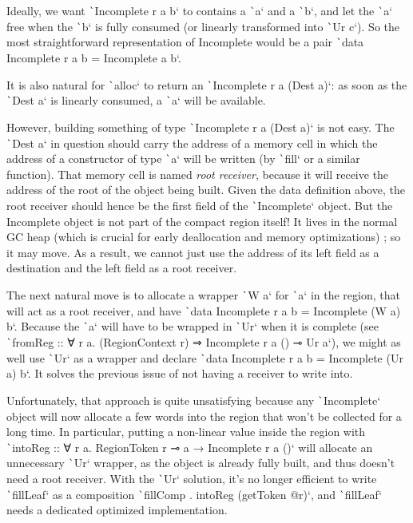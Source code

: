 \documentclass[english]{jflart}
\begin{document}
Ideally, we want \texttt`Incomplete r a b` to contains a \texttt`a` and a \texttt`b`, and let the \texttt`a` free when the \texttt`b` is fully consumed (or linearly transformed into \texttt`Ur c`). So the most straightforward representation of Incomplete would be a pair \texttt`data Incomplete r a b = Incomplete a b`.

It is also natural for \texttt`alloc` to return an \texttt`Incomplete r a (Dest a)`: as soon as the \texttt`Dest a` is linearly consumed, a \texttt`a` will be available.

However, building something of type \texttt`Incomplete r a (Dest a)` is not easy. The \texttt`Dest a` in question should carry the address of a memory cell in which the address of a constructor of type \texttt`a` will be written (by \texttt`fill` or a similar function). That memory cell is named \emph{root receiver}, because it will receive the address of the root of the object being built. Given the data definition above, the root receiver should hence be the first field of the \texttt`Incomplete` object. But the Incomplete object is not part of the compact region itself! It lives in the normal GC heap (which is crucial for early deallocation and memory optimizations) ; so it may move. As a result, we cannot just use the address of its left field as a destination and the left field as a root receiver.

The next natural move is to allocate a wrapper \texttt`W a` for \texttt`a` in the region, that will act as a root receiver, and have \texttt`data Incomplete r a b = Incomplete (W a) b`. Because the \texttt`a` will have to be wrapped in \texttt`Ur` when it is complete (see \texttt`fromReg :: ∀ r a. (RegionContext r) ⇒ Incomplete r a () ⊸ Ur a`), we might as well use \texttt`Ur` as a wrapper and declare \texttt`data Incomplete r a b = Incomplete (Ur a) b`. It solves the previous issue of not having a receiver to write into.

Unfortunately, that approach is quite unsatisfying because any \texttt`Incomplete` object will now allocate a few words into the region that won't be collected for a long time. In particular, putting a non-linear value inside the region with \texttt`intoReg :: ∀ r a. RegionToken r ⊸ a → Incomplete r a ()` will allocate an unnecessary \texttt`Ur` wrapper, as the object is already fully built, and thus doesn't need a root receiver. With the \texttt`Ur` solution, it's no longer efficient to write \texttt`fillLeaf` as a composition \texttt`fillComp . intoReg (getToken @r)`, and \texttt`fillLeaf` needs a dedicated optimized implementation.
\end{document}
